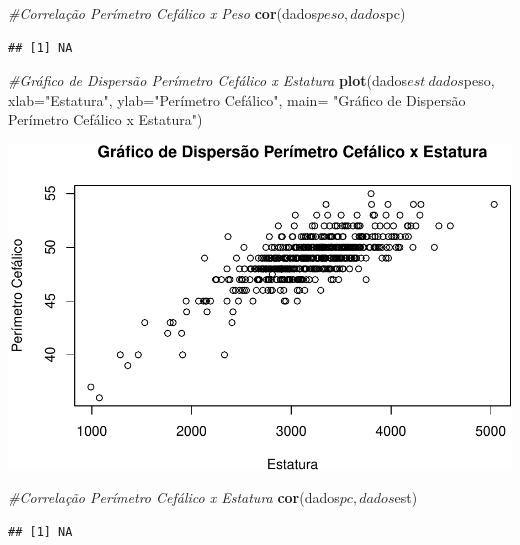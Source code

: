 \documentclass[11pt,]{article}
\makeatletter
\newenvironment{Shaded}{\begin{snugshade}}{\end{snugshade}}
\newcommand{\KeywordTok}[1]{\textcolor[rgb]{0.13,0.29,0.53}{\textbf{{#1}}}}
\newcommand{\DataTypeTok}[1]{\textcolor[rgb]{0.13,0.29,0.53}{{#1}}}
\newcommand{\StringTok}[1]{\textcolor[rgb]{0.31,0.60,0.02}{{#1}}}
\newcommand{\CommentTok}[1]{\textcolor[rgb]{0.56,0.35,0.01}{\textit{{#1}}}}
\newcommand{\NormalTok}[1]{{#1}}
\def\maxwidth{\ifdim\Gin@nat@width>\linewidth\linewidth
\else\Gin@nat@width\fi}
\let\Oldincludegraphics\includegraphics
\renewcommand{\includegraphics}[1]{\Oldincludegraphics[width=\maxwidth]{#1}}
\makeatother
\begin{document}
\begin{Shaded}
\begin{Highlighting}[]
\CommentTok{#Correlação Perímetro Cefálico x Peso}
\KeywordTok{cor}\NormalTok{(dados$peso,dados$pc)}
\end{Highlighting}
\end{Shaded}

\begin{verbatim}
## [1] NA
\end{verbatim}

\begin{Shaded}
\begin{Highlighting}[]
\CommentTok{#Gráfico de Dispersão Perímetro Cefálico x Estatura}
\KeywordTok{plot}\NormalTok{(dados$est~dados$peso, }\DataTypeTok{xlab=}\StringTok{"Estatura"}\NormalTok{, }\DataTypeTok{ylab=}\StringTok{"Perímetro Cefálico"}\NormalTok{,}
     \DataTypeTok{main=} \StringTok{"Gráfico de Dispersão Perímetro Cefálico x Estatura"}\NormalTok{)}
\end{Highlighting}
\end{Shaded}

\includegraphics{versaofinal_lista3_files/figure-latex/unnamed-chunk-8-2.pdf}

\begin{Shaded}
\begin{Highlighting}[]
\CommentTok{#Correlação Perímetro Cefálico x Estatura}
\KeywordTok{cor}\NormalTok{(dados$pc,dados$est)}
\end{Highlighting}
\end{Shaded}

\begin{verbatim}
## [1] NA
\end{verbatim}
\end{document}
